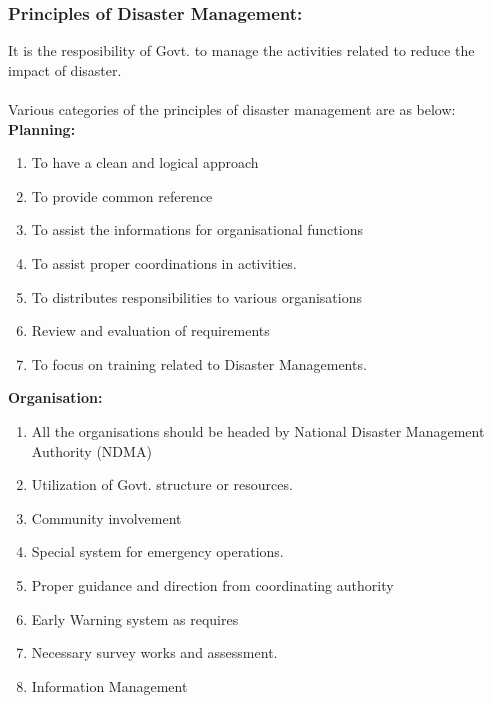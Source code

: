 \documentclass[12pt,a4paper]{article}
\begin{document}
\subsubsection*{Principles of Disaster Management: }
It is the resposibility of Govt. to manage the activities related to reduce the impact of disaster.\\ \\
Various categories of the principles of disaster management are as below: \\
\textbf{Planning: }
\begin{enumerate}
	\item To have a clean and logical approach
	\item To provide common reference
	\item To assist the informations for organisational functions
	\item To assist proper coordinations in activities.
	\item To distributes responsibilities to various organisations
	\item Review and evaluation of requirements
	\item To focus on training related to Disaster Managements.  
\end{enumerate}
\textbf{Organisation: }
\begin{enumerate}
	\item All the organisations should be headed by National Disaster Management Authority (NDMA)
	\item Utilization of Govt. structure or resources.
	\item Community involvement
	\item Special system for emergency operations.
	\item Proper guidance and direction from coordinating authority
	\item Early Warning system as requires
	\item Necessary survey works and assessment.
	\item Information Management
\end{enumerate}


  
\end{document}
